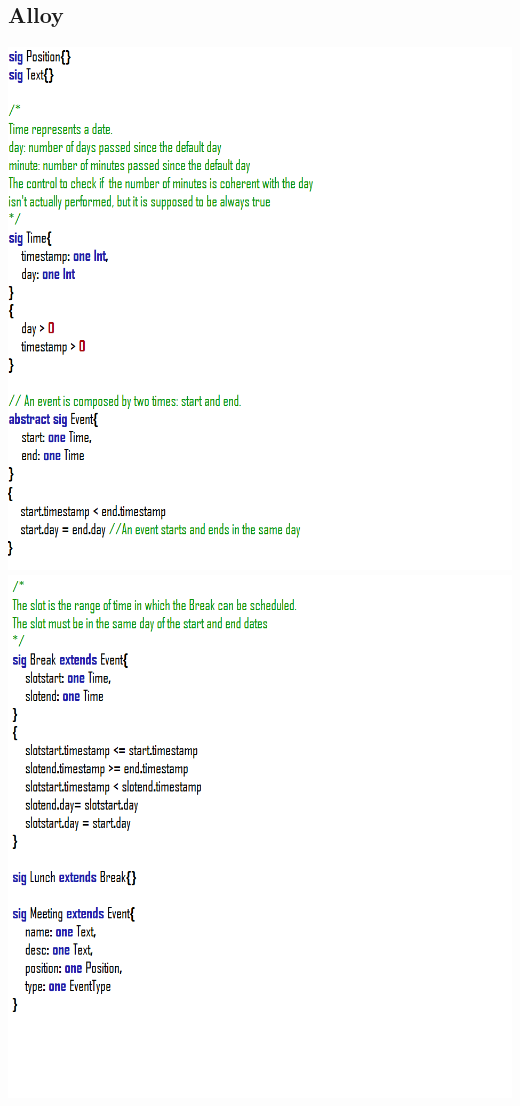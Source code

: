 \subsection{Alloy}
\includegraphics[scale=1]{Images/alloy1}
\clearpage
\includegraphics[scale=1]{Images/alloy2}
